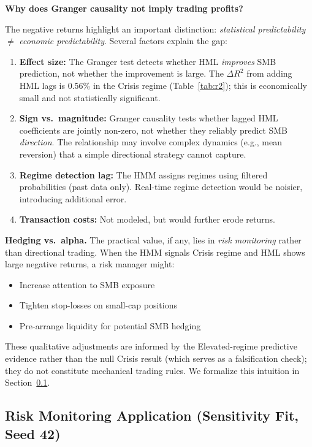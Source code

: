 \documentclass[sigconf,anonymous]{acmart}
\begin{document}
\textbf{Why does Granger causality not imply trading profits?}

The negative returns highlight an important distinction: \emph{statistical predictability}
$\neq$ \emph{economic predictability}. Several factors explain the gap:

\begin{enumerate}
    \item \textbf{Effect size:} The Granger test detects whether HML \emph{improves}
    SMB prediction, not whether the improvement is large. The $\Delta R^2$ from
    adding HML lags is 0.56\% in the Crisis regime (Table~\ref{tab:r2}); this is
    economically small and not statistically significant.

    \item \textbf{Sign vs.\ magnitude:} Granger causality tests whether lagged HML
    coefficients are jointly non-zero, not whether they reliably predict SMB \emph{direction}.
    The relationship may involve complex dynamics (e.g., mean reversion) that a simple
    directional strategy cannot capture.

    \item \textbf{Regime detection lag:} The HMM assigns regimes using filtered
    probabilities (past data only). Real-time regime detection would be noisier, introducing
    additional error.

    \item \textbf{Transaction costs:} Not modeled, but would further erode returns.
\end{enumerate}

\textbf{Hedging vs.\ alpha.} The practical value, if any, lies in \emph{risk monitoring}
rather than directional trading. When the HMM signals Crisis regime and HML shows
large negative returns, a risk manager might:
\begin{itemize}
    \item Increase attention to SMB exposure
    \item Tighten stop-losses on small-cap positions
    \item Pre-arrange liquidity for potential SMB hedging
\end{itemize}

These qualitative adjustments are informed by the Elevated-regime predictive evidence rather than the null Crisis result (which serves as a falsification check); they do not constitute mechanical trading rules. We formalize this intuition in Section~\ref{sec:risk_monitoring}.

\subsection{Risk Monitoring Application (Sensitivity Fit, Seed 42)}
\label{sec:risk_monitoring}
\end{document}

